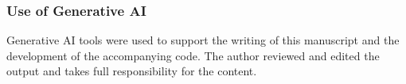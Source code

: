 \documentclass[10pt]{article}
\theoremstyle{plain}
\theoremstyle{definition}
\begin{document}
\subsubsection*{Use of Generative AI}
Generative AI tools were used to support the writing of this manuscript and the
development of the accompanying code. The author reviewed and edited the output and
takes full responsibility for the content.




\appendix

\end{document}
